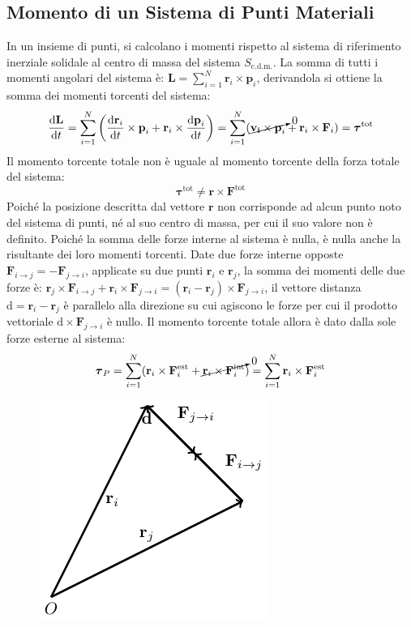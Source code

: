 \documentclass{article}
\newcommand{\vect}[1]{\boldsymbol{\mathbf{#1}}}
\newcommand{\df}{\mathrm{d}}
\numberwithin{equation}{subsection}
\begin{document}
\subsection{Momento di un Sistema di Punti Materiali}

In un insieme di punti, si calcolano i momenti rispetto 
al sistema di riferimento inerziale solidale al centro 
di massa del sistema $S_{\mathrm{c.d.m.}}$. La somma 
di tutti i momenti angolari del sistema è: $\vect{L}=\sum_{i=1}^{N}\vect{r}_i\times\vect{p}_i$, 
derivandola si ottiene la somma dei momenti torcenti 
del sistema: 
\begin{equation}
    \displaystyle\frac{\df\vect{L}}{\df t}=\sum_{i=1}^{N}\left(\frac{\df\vect{r}_i}{\df t}\times\vect{p}_i+\vect{r}_i\times\frac{\df\vect{p}_i}{\df t}\right)=\sum_{i=1}^{N}(\cancelto{0}{\vect{v_i}\times\vect{p}_i}+\vect{r}_i\times\vect{F}_i)=\vect{\tau}^\mathrm{tot}
\end{equation}
Il momento torcente totale non è uguale al momento torcente 
della forza totale del sistema: 
\begin{equation}
    \vect{\tau}^\mathrm{tot}\neq\vect{r}\times\vect{F}^\mathrm{tot}
\end{equation}
Poiché la posizione descritta dal vettore $\vect{r}$ non corrisponde ad alcun punto noto del sistema di punti, né al suo centro di massa, per cui il suo valore non è definito. 
Poiché la somma delle forze interne al sistema è nulla, è nulla anche la risultante dei loro momenti torcenti. Date due forze interne opposte 
$\vect{F}_{i\to j}=-\vect{F}_{j\to i}$, applicate su due punti 
$\vect{r}_i$ e $\vect{r}_j$, la somma dei momenti delle due forze 
è: $\vect{r}_j\times\vect{F}_{i\to j}+\vect{r}_i\times\vect{F}_{j\to i}=(\vect r_i-\vect r_j)\times\vect{F}_{j\to i}$, 
il vettore distanza $\vect{\df}=\vect{r}_i-\vect{r}_j$ è parallelo 
alla direzione su cui agiscono le forze per cui il prodotto 
vettoriale $\vect{\df}\times\vect{F}_{j\to i}$ è nullo. 
Il momento torcente totale allora è dato dalla sole forze esterne al sistema:
\begin{equation}
    \vect{\tau}_P=\displaystyle\sum_{i=1}^{N}(\vect{r}_i\times\vect{F}^\mathrm{est}_i+\cancelto{0}{\vect{r}_i\times\vect{F}^\mathrm{int}_i})=\sum_{i=1}^{N}\vect{r}_i\times\vect{F}^\mathrm{est}_i
\end{equation}
\begin{figure}[H]%
    \centering
    \includegraphics{momento-punti.pdf}%
\end{figure}
\end{document}

